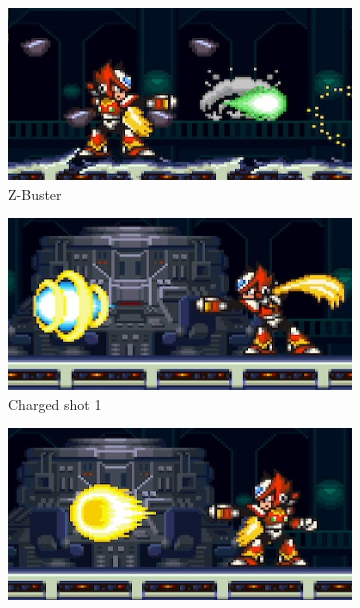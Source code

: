 \begin{figure}[htp]
	\centering
	\begin{subfigure}{0.4\linewidth}
		\centering
		\includegraphics[width=\linewidth]{figures/X2/Hunter_stages/Zero_shot.png}
		\caption{Z-Buster}	
	\end{subfigure}
	\begin{subfigure}{0.4\linewidth}
		\centering
		\includegraphics[width=\linewidth]{figures/X2/Hunter_stages/Zero_combo_1.png}
		\caption{Charged shot 1}
	\end{subfigure}
	\begin{subfigure}{0.4\linewidth}
		\centering
		\includegraphics[width=\linewidth]{figures/X2/Hunter_stages/Zero_combo_2.png}

\end{subfigure}
\end{figure}

